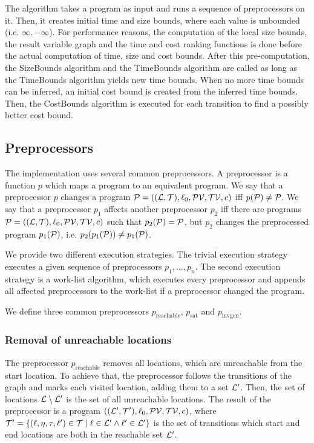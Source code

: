 The algorithm takes a program as input and runs a sequence of preprocessors on it.
Then, it creates initial time and size bounds, where each value is unbounded (i.e. $\infty, -\infty$).
For performance reasons, the computation of the local size bounds, the result variable graph and the time and cost ranking functions is done before the actual computation of time, size and cost bounds.
After this pre-computation, the SizeBounds algorithm and the TimeBounds algorithm are called as long as the TimeBounds algorithm yields new time bounds.
When no more time bounds can be inferred, an initial cost bound is created from the inferred time bounds.
Then, the CostBounds algorithm is executed for each transition to find a possibly better cost bound.

\subsection{Preprocessors}

The implementation uses several common preprocessors.
A preprocessor is a function $p$ which maps a program to an equivalent program.
We say that a preprocessor $p$ changes a program $\mathcal{P} = ((\mathcal{L}, \mathcal{T}), \ell_0, \mathcal{PV}, \mathcal{TV}, c)$ iff $p(\mathcal{P}) \neq \mathcal{P}$.
We say that a preprocessor $p_1$ affects another preprocessor $p_2$ iff there are programs $\mathcal{P} = ((\mathcal{L}, \mathcal{T}), \ell_0, \mathcal{PV}, \mathcal{TV}, c)$ such that $p_2(\mathcal{P}) = \mathcal{P}$, but $p_2$ changes the preprocessed program $p_1(\mathcal{P})$, i.e. $p_2(p_1(\mathcal{P})) \neq p_1(\mathcal{P})$.

We provide two different execution strategies.
The trivial execution strategy executes a given sequence of preprocessors $p_1, \dots, p_n$.
The second execution strategy is a work-list algorithm, which executes every preprocessor and appends all affected preprocessors to the work-list if a preprocessor changed the program.

We define three common preprocessors $p_{\text{reachable}}$, $p_{\text{sat}}$ and $p_{\text{invgen}}$.

\subsubsection{Removal of unreachable locations}

The preprocessor $p_{\text{reachable}}$ removes all locations, which are unreachable from the start location.
To achieve that, the preprocessor follows the transitions of the graph and marks each visited location, adding them to a set $\mathcal{L}'$.
Then, the set of locations $\mathcal{L} \setminus \mathcal{L}'$ is the set of all unreachable locations.
The result of the preprocessor is a program $((\mathcal{L}', \mathcal{T}'), \ell_0, \mathcal{PV}, \mathcal{TV}, c)$, where $\mathcal{T}' = \lbrace (\ell,\eta,\tau,\ell') \in \mathcal{T} \mid \ell \in \mathcal{L}' \wedge \ell' \in \mathcal{L}' \rbrace$ is the set of transitions which start and end locations are both in the reachable set $\mathcal{L}'$.

